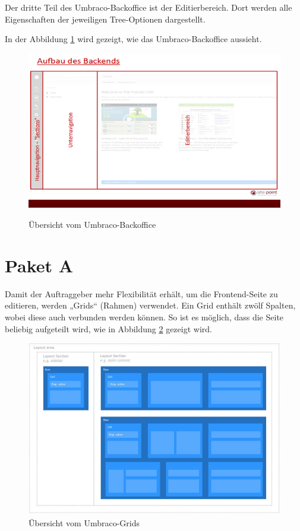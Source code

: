 Der dritte Teil des Umbraco-Backoffice ist der Editierbereich. Dort werden alle Eigenschaften der jeweiligen Tree-Optionen dargestellt.

In der Abbildung \ref{fig:UmbracoBackoffice} wird gezeigt, wie das Umbraco-Backoffice aussieht.
\begin{figure}[h]
	\centering
	\includegraphics[width=1\linewidth]{Graphics/UmbracoBackend.png}
	\caption[Umbraco Backoffice]{Übersicht vom Umbraco-Backoffice}\cite{Beckert2017}
	\label{fig:UmbracoBackoffice}
\end{figure}

\pagebreak
\section{Paket A}

Damit der Auftraggeber mehr Flexibilität erhält, um die Frontend-Seite zu editieren, werden „Grids“ (Rahmen) verwendet. Ein Grid enthält zwölf Spalten, wobei diese auch verbunden werden können. So ist es möglich, dass die Seite beliebig aufgeteilt wird, wie in Abbildung \ref{fig:GridsLayout} gezeigt wird.

\begin{figure}[h]
	\centering
	\includegraphics[width=1\linewidth]{Graphics/GridsLayout.png}
	\caption[GridsLayout]{Übersicht vom Umbraco-Grids}
	\label{fig:GridsLayout}
\end{figure}


